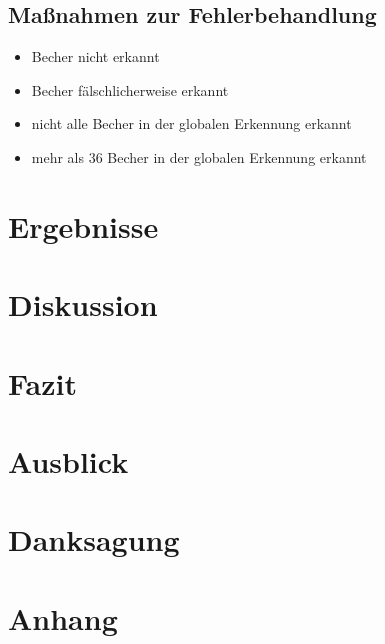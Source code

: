 \documentclass[11pt]{scrartcl}
\begin{document}
    \subsection{Maßnahmen zur Fehlerbehandlung}
    \begin{itemize}
        \item Becher nicht erkannt
        \item Becher fälschlicherweise erkannt
        \item nicht alle Becher in der globalen Erkennung erkannt
        \item mehr als 36 Becher in der globalen Erkennung erkannt
    \end{itemize}

    \newpage
    \section{Ergebnisse}

    \newpage
    \section{Diskussion}

    \newpage
    \section{Fazit}

    \newpage
    \section{Ausblick}

    \newpage
    \section{Danksagung}

    \newpage
    \section{Anhang}
\end{document}
